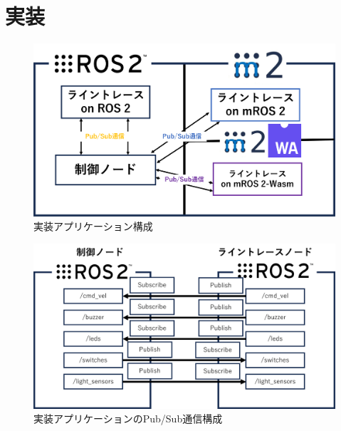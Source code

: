 \chapter{実装}
\begin{figure}[ht]
    \centering
    \includegraphics[width=15cm]{images/fig4_mros2_ros2_raspimouse_configuration.png}
    \caption{実装アプリケーション構成}
    \label{fig:mros2_ros2_raspimouse_configuration}
\end{figure}
\begin{figure}[h]
    \centering
    \includegraphics[width=15cm]{images/fig4_pubsub_configuration.png}
    \caption{実装アプリケーションのPub/Sub通信構成}
    \label{fig:mros2_ros2_pubsub_configuration}
\end{figure}

